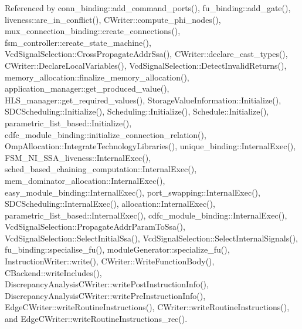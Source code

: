 Referenced by conn\+\_\+binding\+::add\+\_\+command\+\_\+ports(), fu\+\_\+binding\+::add\+\_\+gate(), liveness\+::are\+\_\+in\+\_\+conflict(), C\+Writer\+::compute\+\_\+phi\+\_\+nodes(), mux\+\_\+connection\+\_\+binding\+::create\+\_\+connections(), fsm\+\_\+controller\+::create\+\_\+state\+\_\+machine(), Vcd\+Signal\+Selection\+::\+Cross\+Propagate\+Addr\+Ssa(), C\+Writer\+::declare\+\_\+cast\+\_\+types(), C\+Writer\+::\+Declare\+Local\+Variables(), Vcd\+Signal\+Selection\+::\+Detect\+Invalid\+Returns(), memory\+\_\+allocation\+::finalize\+\_\+memory\+\_\+allocation(), application\+\_\+manager\+::get\+\_\+produced\+\_\+value(), H\+L\+S\+\_\+manager\+::get\+\_\+required\+\_\+values(), Storage\+Value\+Information\+::\+Initialize(), S\+D\+C\+Scheduling\+::\+Initialize(), Scheduling\+::\+Initialize(), Schedule\+::\+Initialize(), parametric\+\_\+list\+\_\+based\+::\+Initialize(), cdfc\+\_\+module\+\_\+binding\+::initialize\+\_\+connection\+\_\+relation(), Omp\+Allocation\+::\+Integrate\+Technology\+Libraries(), unique\+\_\+binding\+::\+Internal\+Exec(), F\+S\+M\+\_\+\+N\+I\+\_\+\+S\+S\+A\+\_\+liveness\+::\+Internal\+Exec(), sched\+\_\+based\+\_\+chaining\+\_\+computation\+::\+Internal\+Exec(), mem\+\_\+dominator\+\_\+allocation\+::\+Internal\+Exec(), easy\+\_\+module\+\_\+binding\+::\+Internal\+Exec(), port\+\_\+swapping\+::\+Internal\+Exec(), S\+D\+C\+Scheduling\+::\+Internal\+Exec(), allocation\+::\+Internal\+Exec(), parametric\+\_\+list\+\_\+based\+::\+Internal\+Exec(), cdfc\+\_\+module\+\_\+binding\+::\+Internal\+Exec(), Vcd\+Signal\+Selection\+::\+Propagate\+Addr\+Param\+To\+Ssa(), Vcd\+Signal\+Selection\+::\+Select\+Initial\+Ssa(), Vcd\+Signal\+Selection\+::\+Select\+Internal\+Signals(), fu\+\_\+binding\+::specialise\+\_\+fu(), module\+Generator\+::specialize\+\_\+fu(), Instruction\+Writer\+::write(), C\+Writer\+::\+Write\+Function\+Body(), C\+Backend\+::write\+Includes(), Discrepancy\+Analysis\+C\+Writer\+::write\+Post\+Instruction\+Info(), Discrepancy\+Analysis\+C\+Writer\+::write\+Pre\+Instruction\+Info(), Edge\+C\+Writer\+::write\+Routine\+Instructions(), C\+Writer\+::write\+Routine\+Instructions(), and Edge\+C\+Writer\+::write\+Routine\+Instructions\+\_\+rec().

